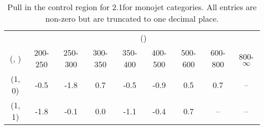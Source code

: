 \begin{table}[h!]
\tiny
\centering
\caption{Pull in the \mmj control region for 2.1\ifb for monojet categories. All entries are non-zero but are truncated to one decimal place.\label{tab:pullsepnaive_mumu_ewk_mono}}
\begin{tabular}
{ccccccccc}
	\hline\hline
	& \multicolumn{8}{c}{\scalht (\gev)} \\ 
	 (\njet,  \nb) & 200-250 & 250-300 & 300-350 & 350-400 & 400-500 & 500-600 & 600-800 & 800-$\infty$ \\ [0.8ex] 
\hline
	(1, 0) & -0.5 & -1.8 & 0.7 & -0.5 & -0.9 & 0.5 & 0.7 & -- \\[0.5ex] 
	(1, 1) & -1.8 & -0.1 & 0.0 & -1.1 & -0.4 & 0.7 & -- & -- \\[0.5ex] 
	\hline
	\hline
\end{tabular}
\end{table}
